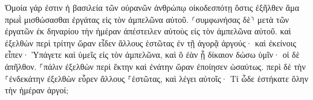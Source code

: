 \documentclass{openreader}
\begin{document}
Ὁμοία γάρ ἐστιν ἡ βασιλεία τῶν οὐρανῶν ἀνθρώπῳ οἰκοδεσπότῃ ὅστις ἐξῆλθεν ἅμα πρωῒ μισθώσασθαι ἐργάτας εἰς τὸν ἀμπελῶνα αὐτοῦ. 
⸂συμφωνήσας δὲ⸃ μετὰ τῶν ἐργατῶν ἐκ δηναρίου τὴν ἡμέραν ἀπέστειλεν αὐτοὺς εἰς τὸν ἀμπελῶνα αὐτοῦ. 
καὶ ἐξελθὼν περὶ τρίτην ὥραν εἶδεν ἄλλους ἑστῶτας ἐν τῇ ἀγορᾷ ἀργούς· 
καὶ ἐκείνοις εἶπεν· Ὑπάγετε καὶ ὑμεῖς εἰς τὸν ἀμπελῶνα, καὶ ὃ ἐὰν ᾖ δίκαιον δώσω ὑμῖν· 
οἱ δὲ ἀπῆλθον. ⸀πάλιν ἐξελθὼν περὶ ἕκτην καὶ ἐνάτην ὥραν ἐποίησεν ὡσαύτως. 
περὶ δὲ τὴν ⸀ἑνδεκάτην ἐξελθὼν εὗρεν ἄλλους ⸀ἑστῶτας, καὶ λέγει αὐτοῖς· Τί ὧδε ἑστήκατε ὅλην τὴν ἡμέραν ἀργοί; 
\end{document}
